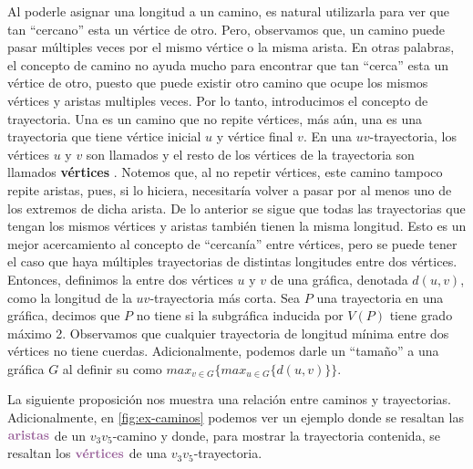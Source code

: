     Al poderle asignar una longitud a un camino, es natural utilizarla para ver
    que tan ``cercano'' esta un v\'ertice de otro. Pero, observamos que, un
    camino puede pasar m\'ultiples veces por el mismo v\'ertice o la misma
    arista. En otras palabras, el concepto de camino no ayuda mucho para
    encontrar que tan ``cerca'' esta un v\'ertice de otro, puesto que puede
    existir otro camino que ocupe los mismos v\'ertices y aristas multiples
    veces. Por lo tanto, introducimos el concepto de trayectoria. Una
     es un camino que no repite v\'ertices, m\'as a\'un, una
     es una trayectoria que tiene v\'ertice inicial $u$
    y v\'ertice final $v$. En una $uv$-trayectoria, los v\'ertices $u$ y $v$ son
    llamados  y el resto de los v\'ertices de la
    trayectoria son llamados \textbf{v\'ertices}
    . Notemos que, al no repetir v\'ertices,
    este camino tampoco repite aristas, pues, si lo hiciera, necesitar\'ia
    volver a pasar por al menos uno de los extremos de dicha arista. De lo
    anterior se sigue que todas las trayectorias que tengan los mismos
    v\'ertices y aristas tambi\'en tienen la misma longitud. Esto es un mejor
    acercamiento al concepto de ``cercan\'ia'' entre v\'ertices, pero se puede
    tener el caso que haya m\'ultiples trayectorias de distintas longitudes
    entre dos v\'ertices. Entonces, definimos la  entre dos
    v\'ertices $u$ y $v$ de una gr\'afica, denotada $d(u,v)$, como la longitud
    de la $uv$-trayectoria m\'as corta. Sea $P$ una trayectoria en una
    gr\'afica, decimos que $P$ no tiene  si la subgr\'afica
    inducida por $V(P)$ tiene grado m\'aximo 2. Observamos que cualquier
    trayectoria de longitud m\'inima entre dos v\'ertices no tiene cuerdas.
    Adicionalmente, podemos darle un ``tama\~{n}o'' a una gr\'afica $G$ al
    definir su  como $max_{v\in G}\{max_{u\in
    G}\{d(u,v)\}\}$. 
    
    La siguiente proposici\'on nos muestra una relaci\'on entre caminos y
    trayectorias. Adicionalmente, en \cref{fig:ex-caminos} podemos ver un
    ejemplo donde se resaltan las ${\color{morado}\bf aristas}$ de un $v_3
    v_5$-camino y donde, para mostrar la trayectoria contenida, se resaltan los
    ${\color{morado}\textbf{v\'ertices}}$ de una $v_3 v_5$-trayectoria. 
    

